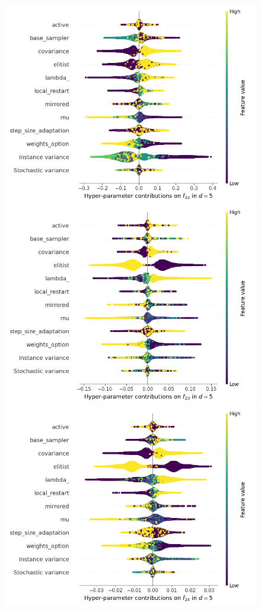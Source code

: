 \begin{figure}[t]
	\includegraphics[height=0.15\textheight,trim=60mm 0mm 30mm 0mm,clip]{cma_img_new/img_summary_f22_d5.png}
	\includegraphics[height=0.15\textheight,trim=60mm 0mm 30mm 0mm,clip]{cma_img_new/img_summary_f23_d5.png}
	\includegraphics[height=0.15\textheight,trim=60mm 0mm 0mm 0mm,clip]{cma_img_new/img_summary_f24_d5.png}

\end{figure}
